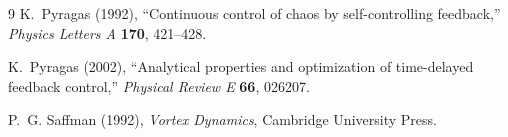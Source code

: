 \begin{thebibliography}{9}
K.~Pyragas (1992),
``Continuous control of chaos by self-controlling feedback,''
\textit{Physics Letters A} \textbf{170}, 421--428.

K.~Pyragas (2002),
``Analytical properties and optimization of time-delayed feedback control,''
\textit{Physical Review E} \textbf{66}, 026207.

P.~G. Saffman (1992),
\textit{Vortex Dynamics}, Cambridge University Press.
\end{thebibliography}
